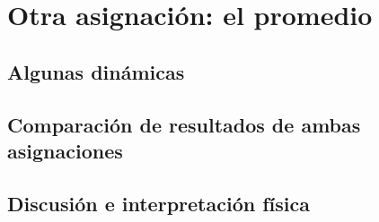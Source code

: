 \chapter{Otra asignación: el promedio}

\section{Algunas dinámicas}

\section{Comparación de resultados de ambas asignaciones}

\section{Discusión e interpretación física}

